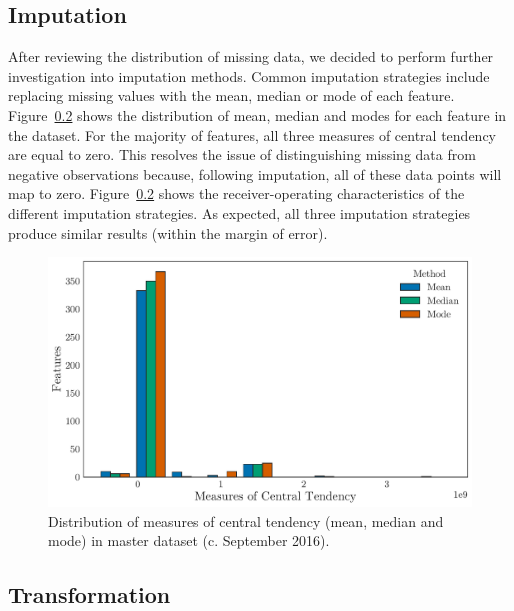 \documentclass[../thesis/thesis.tex]{subfiles}
\begin{document}
\subsection{Imputation}

After reviewing the distribution of missing data, we decided to perform further investigation into imputation methods. Common imputation strategies include replacing missing values with the mean, median or mode of each feature. Figure~\ref{} shows the distribution of mean, median and modes for each feature in the dataset. For the majority of features, all three measures of central tendency are equal to zero. This resolves the issue of distinguishing missing data from negative observations because, following imputation, all of these data points will map to zero. Figure~\ref{} shows the receiver-operating characteristics of the different imputation strategies. As expected, all three imputation strategies produce similar results (within the margin of error).

\begin{figure}[!htb]
    \centering
    \includegraphics[width=\textwidth]{../figures/design/central_tendency}
    \caption{Distribution of measures of central tendency (mean, median and mode) in master dataset (c. September 2016).}
    \label{fig:design:central_tendency}
\end{figure}


\subsection{Transformation}
\end{document}
